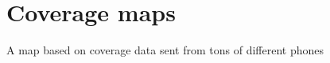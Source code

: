 \section{Coverage maps}
\label{sec:covmap}

A map based on coverage data sent from tons of different phones